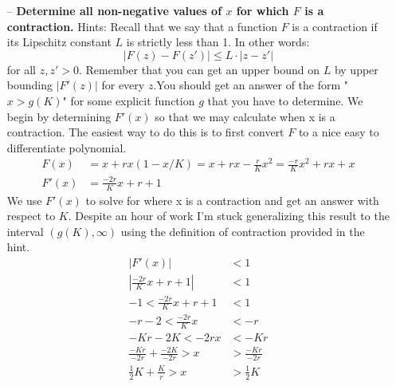 \documentclass{article}
\begin{document}
\begin{itemize}
\begin{itemize}
        \newpage
        \item[--] \textbf{Determine all non-negative values of $x$ for which $F$ is a contraction.} Hints: Recall that we say that a function $F$ is a contraction if its Lipschitz constant $L$ is strictly less than 1. In other words:
        \[|F(z) - F(z')| \leq L \cdot |z - z'|\]
        for all $z, z' > 0$. Remember that you can get an upper bound on $L$ by upper bounding $|F'(z)|$ for every $z$.\newline You should get an answer of the form "$x > g(K)$" for some explicit function $g$ that you have to determine.
        \newline\newline
        We begin by determining $F'(x)$ so that we may calculate when x is a contraction. The easiest way to do this is to first convert $F$ to a nice easy to differentiate polynomial. 
        \begin{equation}
        \begin{split}
            F(x) &= x + rx(1 - x/K) = x + rx - \frac{r}{K}x^2 = \frac{-r}{K}x^2 + rx + x \\
            F'(x) &= \frac{-2r}{K}x + r + 1
        \end{split}
        \end{equation}
        We use $F'(x)$ to solve for where x is a contraction and get an answer with respect to $K$. Despite an hour of work I'm stuck generalizing this result to  the interval $(g(K), \infty)$ using the definition of contraction provided in the hint. 
        \begin{equation}
        \begin{split}
             |F'(x)| &< 1 \\
            \left|\frac{-2r}{K}x + r + 1\right| &< 1 \\
            -1 < \frac{-2r}{K}x + r + 1 &< 1 \\
            -r-2 < \frac{-2r}{K}x &< -r \\
            -Kr - 2K < -2rx &< -Kr \\
            \frac{-Kr}{-2r} + \frac{-2K}{-2r} > x &> \frac{-Kr}{-2r} \\
           \frac{1}{2}K + \frac{K}{r} > x &> \frac{1}{2}K
        \end{split}
        \end{equation}
        

\end{itemize}
\end{itemize}
\end{document}
